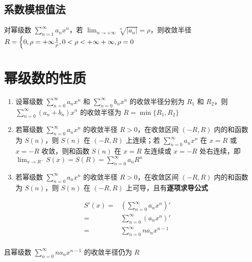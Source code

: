 \documentclass[lang = zh , final , oneside , openany , titlepage , zihao = -4 , linespread = 1.3 , baselineskip = false , cjk-font = windows , text-font = newtx , math-font = newtx , math-style = TeX]{sjtureport}
\begin{document}
\subsection{系数模根值法}

\begin{theorem}
    对幂级数 \(\displaystyle \sum_{n=1}^\infty a_nx^n\)，若
\(\displaystyle \lim_{n\to+\infty}\sqrt[n]{\left\vert a_n\right\vert} = \rho\)，则收敛半径
\(\displaystyle R=\begin{cases}0,\rho=+\infty\newline  \frac{1}{\rho}, 0<\rho<+\infty\newline +\infty ,\rho=0\end{cases}\)
\end{theorem}

\section{幂级数的性质}

\begin{enumerate}
\item
  设幂级数 \(\displaystyle \sum_{n=0}^\infty a_nx^n\) 和
  \(\displaystyle \sum_{n=0}^\infty b_nx^n\) 的收敛半径分别为 \(R_1\) 和
  \(R_2\)，则 \(\displaystyle \sum_{n=0}^\infty (a_n+b_n)x^n\)
  的收敛半径为 \(R=\min\{R_1,R_2\}\)
\item
  若幂级数 \(\displaystyle \sum_{n=0}^\infty a_nx^n\) 的收敛半径
  \(R>0\)，在收敛区间 \((-R,R)\) 内的和函数为 \(S(n)\)，则 \(S(n)\) 在
  \((-R,R)\) 上连续；若 \(\displaystyle\sum_{n=0}^\infty a_nx^n\) 在
  \(x=R\) 或 \(x=-R\) 收敛，则和函数 \(S(n)\) 在 \(x=R\) 左连续或
  \(x=-R\) 处右连续，即
  \(\displaystyle \lim_{x\to R^-}S(x)=S(R)=\sum_{n=0}^\infty a_nR^n\)
\item
  若幂级数 \(\displaystyle \sum_{n=0}^\infty a_nx^n\) 的收敛半径
  \(R>0\)，在收敛区间 \((-R,R)\) 内的和函数为 \(S(n)\)，则 \(S(n)\) 在
  \((-R,R)\) 上可导，且有\textbf{逐项求导公式}
\end{enumerate}

\[\begin{aligned}
  S'(x) = &\left(\sum_{n=0}^\infty a_nx^n\right)'\\
    = &\sum_{n=0}^\infty \left(a_nx^n\right)'\\
    = &\sum_{n=0}^\infty na_nx^{n-1}\\
  \end{aligned}\]

且幂级数 \(\displaystyle \sum_{n=0}^\infty na_nx^{n-1}\) 的收敛半径仍为
\(R\)
\end{document}
